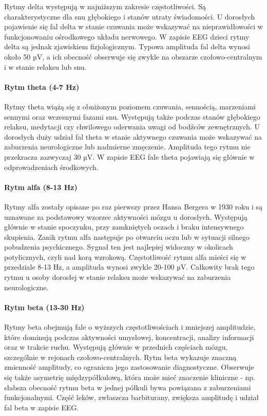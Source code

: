 Rytmy delta występują w najniższym zakresie częstotliwości. Są charakterystyczne dla snu głębokiego i stanów utraty świadomości. U dorosłych pojawienie się fal delta w stanie czuwania może wskazywać na nieprawidłowości w funkcjonowaniu ośrodkowego układu nerwowego. W zapisie EEG dzieci rytmy delta są jednak zjawiskiem fizjologicznym. Typowa amplituda fal delta wynosi około 50 µV, a ich obecność obserwuje się zwykle na obszarze czołowo-centralnym i w stanie relaksu lub snu.

\paragraph{Rytm theta (4-7 Hz)}

Rytmy theta wiążą się z obniżonym poziomem czuwania, sennością, marzeniami sennymi oraz wczesnymi fazami snu. Występują także podczas stanów głębokiego relaksu, medytacji czy chwilowego oderwania uwagi od bodźców zewnętrznych. U dorosłych duży udział fal theta w stanie aktywnego czuwania może wskazywać na zaburzenia neurologiczne lub nadmierne zmęczenie. Amplituda tego rytmu nie przekracza zazwyczaj 30 µV. W zapisie EEG fale theta pojawiają się głównie w odprowadzeniach środkowych.

\paragraph{Rytm alfa (8-13 Hz)}

Rytmy alfa zostały opisane po raz pierwszy przez Hansa Bergera w 1930 roku i są uznawane za podstawowy wzorzec aktywności mózgu u dorosłych. Występują głównie w stanie spoczynku, przy zamkniętych oczach i braku intensywnego skupienia. Zanik rytmu alfa następuje po otwarciu oczu lub w sytuacji silnego pobudzenia psychicznego. Sygnał ten jest najlepiej widoczny w okolicach potylicznych, czyli nad korą wzrokową. Częstotliwość rytmu alfa mieści się w przedziale 8-13 Hz, a amplituda wynosi zwykle 20-100 µV. Całkowity brak tego rytmu u osoby dorosłej w stanie relaksu może wskazywać na zaburzenia neurologiczne.

\paragraph{Rytm beta (13-30 Hz)}

Rytmy beta obejmują fale o wyższych częstotliwościach i mniejszej amplitudzie, które dominują podczas aktywności umysłowej, koncentracji, analizy informacji oraz w trakcie ruchu. Występują głównie w przednich częściach mózgu, szczególnie w rejonach czołowo-centralnych. Rytm beta wykazuje znaczną zmienność amplitudy, co ogranicza jego zastosowanie diagnostyczne. Obserwuje się także asymetrię międzypółkulową, która może mieć znaczenie kliniczne - np. słabsza obecność rytmu beta w jednej półkuli bywa powiązana z zaburzeniami funkcjonalnymi. Część leków, zwłaszcza barbiturany, zwiększa amplitudę i udział fal beta w zapisie EEG.


